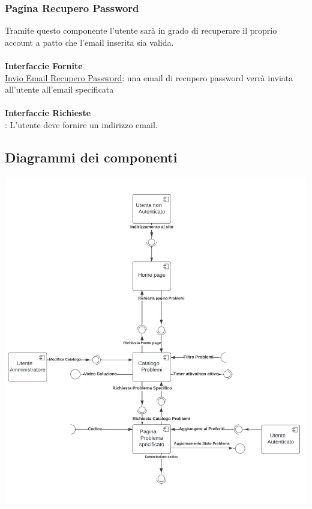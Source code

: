 \documentclass[11pt, a4paper]{article}
\theoremstyle{definition} %
\begin{document}
\subsubsection{Pagina Recupero Password}
Tramite questo componente l'utente sarà in grado di recuperare il proprio account a patto che l'email inserita sia valida.
\\\\\textbf{Interfaccie Fornite}\\
\underline{Invio Email Recupero Password}: una email di recupero password verrà inviata all'utente all'email specificata
\\\\\textbf{Interfaccie Richieste}\\
: L'utente deve fornire un indirizzo email.
\subsection{Diagrammi dei componenti}
\begin{center}
    \hspace*{-1cm}
    \includegraphics[width=1.2\textwidth]{materiale/site-ux.jpg}
\end{center}
  
\end{document}
